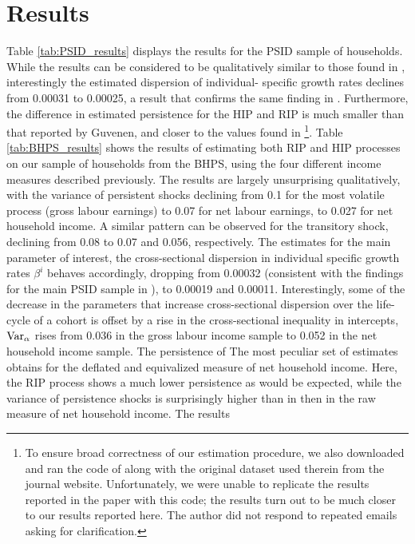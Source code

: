 \section{Results}
Table \ref{tab:PSID_results} displays the results for the PSID sample of households.
While the results can be considered to be qualitatively similar to those found
in \citet{Guvenen2009}, interestingly the estimated dispersion of individual-
specific growth rates declines from 0.00031 to 0.00025, a result that confirms
the same finding in \citet{Hryshko2012}. Furthermore, the difference in estimated
persistence for the HIP and RIP is much smaller than that reported by Guvenen,
and closer to the values found in \citet{Hryshko2012}\footnote{To ensure broad
correctness of our estimation procedure, we also downloaded and ran the code of
\citet{Guvenen2009} along with the original dataset used therein from the journal
website. Unfortunately, we were unable to replicate the results reported in the 
paper with this code; the results turn out to be much closer to our results reported
here. The author did not respond to repeated emails asking for clarification.}.
Table \ref{tab:BHPS_results} shows the results of estimating both RIP and HIP
processes on our sample of households from the BHPS, using the four different
income measures described previously. The results are largely unsurprising 
qualitatively, with the variance of persistent shocks declining from 0.1 for
the most volatile process (gross labour earnings) to 0.07 for net labour earnings,
to 0.027 for net household income. A similar pattern can be observed for the 
transitory shock, declining from 0.08 to 0.07 and 0.056, respectively. The 
estimates for the main parameter of interest, the cross-sectional dispersion 
in individual specific growth rates $\beta^i$ behaves accordingly, dropping from 
0.00032 (consistent with the findings for the main PSID sample in 
\citet{Guvenen2009}), to 0.00019 and 0.00011. Interestingly, some of the decrease
in the parameters that increase cross-sectional dispersion over the life-cycle
of a cohort is offset by a rise in the cross-sectional inequality in intercepts, 
$\mbox{Var}_{\alpha}$ rises from 0.036 in the gross labour income sample to 0.052 in 
the net household income sample. The persistence of 
The most peculiar set of estimates obtains for the deflated and equivalized
measure of net household income. Here, the RIP process shows a much lower persistence
as would be expected, while the variance of persistence shocks is surprisingly 
higher than in then in the raw measure of net household income. The results
